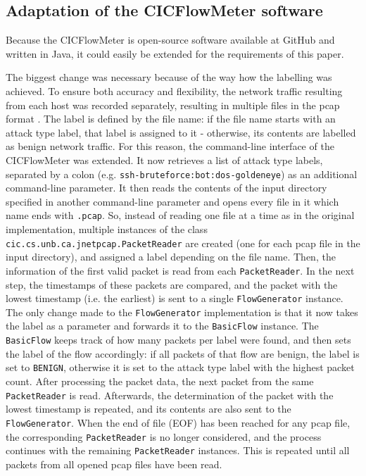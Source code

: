 \documentclass[conference]{IEEEtran}
\begin{document}
\subsection{Adaptation of the CICFlowMeter software}\label{adaptation}
Because the CICFlowMeter is open-source software available at GitHub \cite{cicflowmeter_github} and written in Java, it could easily be extended for the requirements of this paper.

The biggest change was necessary because of the way how the labelling was achieved. To ensure both accuracy and flexibility, the network traffic resulting from each host was recorded separately, resulting in multiple files in the pcap format \cite{paper1}. The label is defined by the file name: if the file name starts with an attack type label, that label is assigned to it - otherwise, its contents are labelled as benign network traffic. For this reason, the command-line interface of the CICFlowMeter was extended. It now retrieves a list of attack type labels, separated by a colon (e.g. \verb|ssh-bruteforce:bot:dos-goldeneye|) as an additional command-line parameter. It then reads the contents of the input directory specified in another command-line parameter and opens every file in it which name ends with \verb|.pcap|. So, instead of reading one file at a time as in the original implementation, multiple instances of the class \verb|cic.cs.unb.ca.jnetpcap.PacketReader| are created (one for each pcap file in the input directory), and assigned a label depending on the file name. Then, the information of the first valid packet is read from each \verb|PacketReader|. In the next step, the timestamps of these packets are compared, and the packet with the lowest timestamp (i.e. the earliest) is sent to a single \verb|FlowGenerator| instance. The only change made to the \verb|FlowGenerator| implementation is that it now takes the label as a parameter and forwards it to the \verb|BasicFlow| instance. The \verb|BasicFlow| keeps track of how many packets per label were found, and then sets the label of the flow accordingly: if all packets of that flow are benign, the label is set to \verb|BENIGN|, otherwise it is set to the attack type label with the highest packet count. After processing the packet data, the next packet from the same \verb|PacketReader| is read. Afterwards, the determination of the packet with the lowest timestamp is repeated, and its contents are also sent to the \verb|FlowGenerator|. When the end of file (EOF) has been reached for any pcap file, the corresponding \verb|PacketReader| is no longer considered, and the process continues with the remaining \verb|PacketReader| instances. This is repeated until all packets from all opened pcap files have been read.
\end{document}
